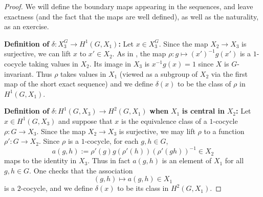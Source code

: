 \documentclass[11pt]{amsart}
\numberwithin{equation}{section}
\theoremstyle{remark}
\theoremstyle{remark}
\theoremstyle{remark}
\theoremstyle{definition}
\theoremstyle{definition}
\theoremstyle{definition}
\theoremstyle{definition}
\theoremstyle{definition}
\theoremstyle{definition}
\begin{document}
\begin{proof}
We will define the boundary maps appearing in the sequences, and leave exactness (and the fact that the maps are well defined), as well as the naturality, as an exercise. 

\textbf{Definition of }$\delta:X_3^G\rightarrow H^1(G,X_1)$\textbf{:} Let $x\in X_3^G$. Since the map $X_2\rightarrow X_3$ is surjective, we can lift $x$ to $x'\in X_2$. As in , the map $\rho:g\mapsto (x')^{-1}g(x')$ is a $1$-cocycle taking values in $X_2$. Its image in $X_3$ is $x^{-1}g(x)=1$ since $X$ is $G$-invariant. Thus $\rho$ takes values in $X_1$ (viewed as a subgroup of $X_2$ via the first map of the short exact sequence) and we define $\delta(x)$ to be the class of $\rho$ in $H^1(G,X_1)$. 

\textbf{Definition of }$\delta:H^1(G,X_3)\rightarrow H^2(G,X_1)$\textbf{ when }$X_1$\textbf{ is central in }$X_2$\textbf{:} Let $x\in H^1(G,X_3)$ and suppose that $x$ is  the equivalence class of a $1$-cocycle $\rho:G\rightarrow X_3$. Since the map $X_2\rightarrow X_3$ is surjective, we may lift $\rho$ to a function $\rho':G\rightarrow X_2$. Since $\rho$ is a $1$-cocycle, for each $g,h\in G$, 
\[a(g,h):=\rho'(g)g(\rho'(h))(\rho'(gh))^{-1}\in X_2\]
maps to the identity in $X_3$. Thus in fact  $a(g,h)$ is an element of $X_1$ for all $g,h\in G$. One checks that the association 
\[(g,h)\mapsto a(g,h)\in X_1\]
is a $2$-cocycle, and we define $\delta(x)$ to be its class in $H^2(G,X_1)$.   
\end{proof}
\end{document}
